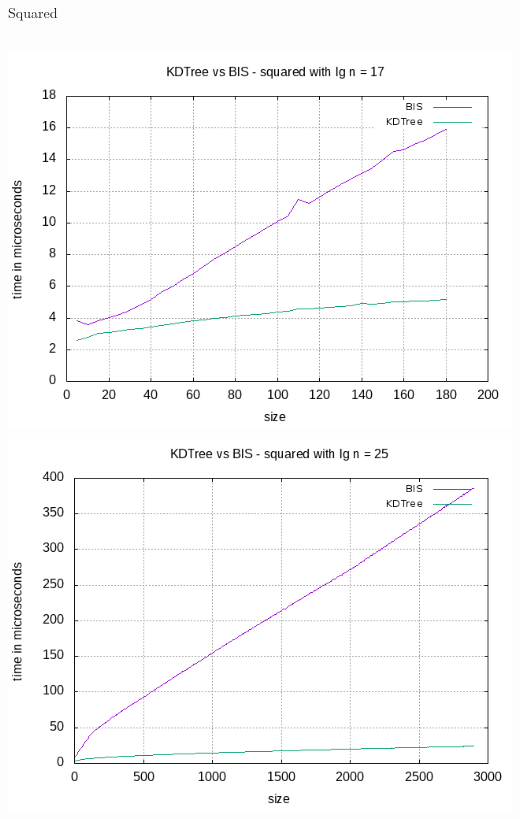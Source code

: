 \documentclass[pdf]{beamer}
\begin{document}
\begin{frame}{Squared}
  \begin{columns}
    \includegraphics[scale=0.35]{pictures/analysis/sqrt_17.png}
    \includegraphics[scale=0.35]{pictures/analysis/sqrt_25.png}
  \end{columns}
\end{frame}
\end{document}
